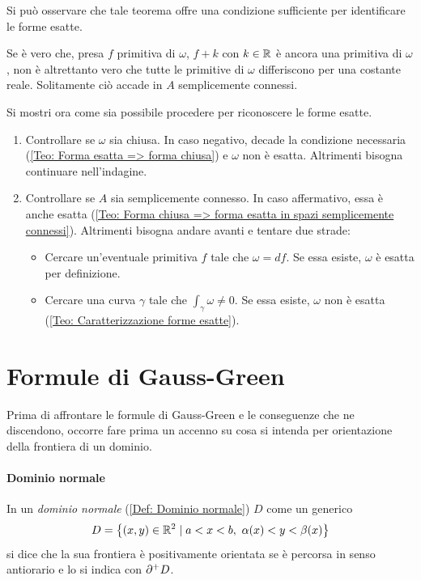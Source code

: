 \begin{oss}
    Si può osservare che tale teorema offre una condizione sufficiente per identificare le forme esatte.
\end{oss}
\begin{oss}
    Se è vero che, presa $f$ primitiva di $\omega$, $f+k$ con $k \in \mathbb{R}$ è ancora una primitiva di $\omega$, non è altrettanto vero che tutte le primitive di $\omega$ differiscono per una costante reale. Solitamente ciò accade in $A$ semplicemente connessi.
\end{oss}
\begin{example}
    Si mostri ora come sia possibile procedere per riconoscere le forme esatte.
\begin{enumerate}
    \item Controllare se $\omega$ sia chiusa. In caso negativo, decade la condizione necessaria (\ref{Teo: Forma esatta => forma chiusa}) e $\omega$ non è esatta. Altrimenti bisogna continuare nell'indagine.
    \item Controllare se $A$ sia semplicemente connesso. In caso affermativo, essa è anche esatta (\ref{Teo: Forma chiusa => forma esatta in spazi semplicemente connessi}). Altrimenti bisogna andare avanti e tentare due strade:
    \begin{itemize}
        \item Cercare un'eventuale primitiva $f$ tale che $\omega= df$. Se essa esiste, $\omega$ è esatta per definizione.
        \item Cercare una curva $\gamma$ tale che $\int_{\gamma}{\omega} \neq 0$. Se essa esiste, $\omega$ non è esatta (\ref{Teo: Caratterizzazione forme esatte}). 
    \end{itemize}
\end{enumerate}
\end{example}
\section{Formule di Gauss-Green}
Prima di affrontare le formule di Gauss-Green e le conseguenze che ne discendono, occorre fare prima un accenno su cosa si intenda per orientazione della frontiera di un dominio.
\paragraph{Dominio normale}
In un \textit{dominio normale} (\ref{Def: Dominio normale}) $D$ come un generico
 \begin{equation}
 D=\left\{ (x,y) \in \mathbb{R}^2 \mid a<x<b,\ \alpha(x)<y<\beta(x)\right\}
 \end{equation}
 si dice che la sua frontiera è positivamente orientata se è percorsa in senso antiorario e lo si indica con $\partial^+ D$.
